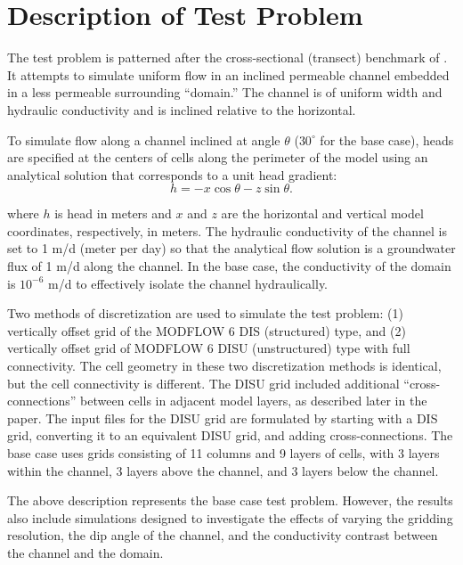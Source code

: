 \documentclass{article}
\begin{document}
\section{Description of Test Problem}

The test problem is patterned after the cross-sectional (transect) benchmark of \cite{bardot2022}. It attempts to simulate uniform flow in an inclined permeable channel embedded in a less permeable surrounding ``domain.'' The channel is of uniform width and hydraulic conductivity and is inclined relative to the horizontal.

To simulate flow along a channel inclined at angle $\theta$ ($30^{\circ}$ for the base case), heads are specified at the centers of cells along the perimeter of the model using an analytical solution that corresponds to a unit head gradient:
\begin{equation}
\label{eqn:head_analyt_along}
h = - x \cos \theta - z \sin \theta.
\end{equation}

\noindent where $h$ is head in meters and $x$ and $z$ are the horizontal and vertical model coordinates, respectively, in meters. The hydraulic conductivity of the channel is set to 1 m/d (meter per day) so that the analytical flow solution is a groundwater flux of 1 m/d along the channel. In the base case, the conductivity of the domain is $10^{-6}$ m/d to effectively isolate the channel hydraulically.

Two methods of discretization are used to simulate the test problem: (1) vertically offset grid of the MODFLOW 6 DIS (structured) type, and (2) vertically offset grid of MODFLOW 6 DISU (unstructured) type with full connectivity. The cell geometry in these two discretization methods is identical, but the cell connectivity is different. The DISU grid included additional ``cross-connections'' between cells in adjacent model layers, as described later in the paper. The input files for the DISU grid are formulated by starting with a DIS grid, converting it to an equivalent DISU grid, and adding cross-connections. The base case uses grids consisting of 11 columns and 9 layers of cells, with 3 layers within the channel, 3 layers above the channel, and 3 layers below the channel. 

The above description represents the base case test problem. However, the results also include simulations designed to investigate the effects of varying the gridding resolution, the dip angle of the channel, and the conductivity contrast between the channel and the domain.
\end{document}
